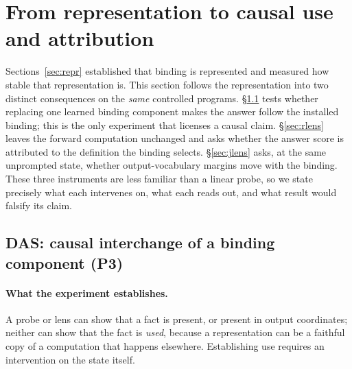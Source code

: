 \documentclass[10pt]{article}
\begin{document}
\section{From representation to causal use and attribution}
\label{sec:part3}
Sections~\ref{sec:repr} established that binding is represented and measured how
stable that representation is. This section follows the representation into two
distinct consequences on the \emph{same} controlled programs. \S\ref{sec:das}
tests whether replacing one learned binding component makes the answer follow the
installed binding; this is the only experiment that licenses a causal claim.
\S\ref{sec:rlens} leaves the forward computation unchanged and asks whether the
answer score is attributed to the definition the binding selects.
\S\ref{sec:jlens} asks, at the same unprompted state, whether output-vocabulary
margins move with the binding. These three instruments are less familiar than a
linear probe, so we state precisely what each intervenes on, what each reads out,
and what result would falsify its claim.

\subsection{DAS: causal interchange of a binding component (P3)}
\label{sec:das}

\paragraph{What the experiment establishes.} A probe or lens can show that a fact
is present, or present in output coordinates; neither can show that the fact is
\emph{used}, because a representation can be a faithful copy of a computation that
happens elsewhere. Establishing use requires an intervention on the state itself.
\end{document}
